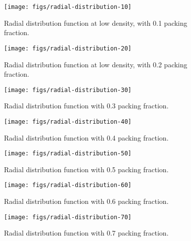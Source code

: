 \documentclass[letterpaper,twocolumn,amsmath,amssymb,prb]{revtex4-1}
\begin{document}
\begin{figure}
\begin{center}
\texttt{[image: figs/radial-distribution-10]}
\end{center}
\caption{Radial distribution function at low density, with 0.1 packing
  fraction.}
\label{fig:radial-distribution-10}
\end{figure}

\begin{figure}
\begin{center}
\texttt{[image: figs/radial-distribution-20]}
\end{center}
\caption{Radial distribution function at low density, with 0.2 packing
  fraction.}
\label{fig:radial-distribution-20}
\end{figure}

\begin{figure}
\begin{center}
\texttt{[image: figs/radial-distribution-30]}
\end{center}
\caption{Radial distribution function with 0.3 packing
  fraction.}
\label{fig:radial-distribution-30}
\end{figure}

\begin{figure}
\begin{center}
\texttt{[image: figs/radial-distribution-40]}
\end{center}
\caption{Radial distribution function with 0.4 packing
  fraction.}
\label{fig:radial-distribution-40}
\end{figure}

\begin{figure}
\begin{center}
\texttt{[image: figs/radial-distribution-50]}
\end{center}
\caption{Radial distribution function with 0.5 packing
  fraction.}
\label{fig:radial-distribution-50}
\end{figure}

\begin{figure}
\begin{center}
\texttt{[image: figs/radial-distribution-60]}
\end{center}
\caption{Radial distribution function with 0.6 packing
  fraction.}
\label{fig:radial-distribution-60}
\end{figure}

\begin{figure}
\begin{center}
\texttt{[image: figs/radial-distribution-70]}
\end{center}
\caption{Radial distribution function with 0.7 packing
  fraction.}
\label{fig:radial-distribution-70}
\end{figure}
\end{document}
